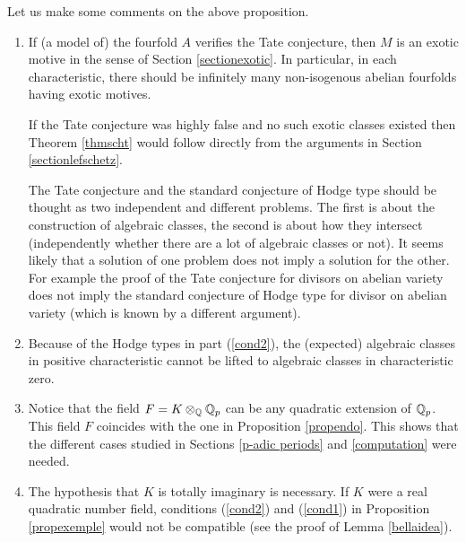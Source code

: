 \begin{remark}
\notready\label{bellaciao} Let us make some comments on the above proposition.
\begin{enumerate}
\item If (a model of) the fourfold $A$ verifies the Tate conjecture, then $M$ is an exotic motive in the sense of Section \ref{sectionexotic}. In particular, in each characteristic, there should be infinitely  many non-isogenous abelian fourfolds having exotic motives.

If the Tate conjecture was highly false and no such exotic classes existed then Theorem \ref{thmscht} would follow directly from the arguments in Section \ref{sectionlefschetz}.

The Tate conjecture and the standard conjecture of Hodge type   should be thought as two independent and different  problems. The first is about the construction of algebraic classes, the second is about how they intersect (independently whether there are a lot of algebraic classes or not). It seems likely that a solution of one problem does not imply a solution for the other. For example the proof of the Tate conjecture for divisors on abelian variety  \cite[Theorem 4]{Tate} does not imply the standard conjecture of Hodge type for divisor on abelian variety (which is known by a different argument).


\item Because of the Hodge types in part (\ref{cond2}), the (expected) algebraic classes in positive characteristic cannot be lifted to algebraic classes in characteristic zero.


\item\label{unamattina} Notice that the field $F=K \otimes_{\mathbb{Q}} \mathbb{Q}_p$ can be any quadratic extension of $\mathbb{Q}_p$. This field $F$ coincides with the one in Proposition \ref{propendo}. This shows that the different cases studied in Sections \ref{p-adic periods} and \ref{computation} were needed.
\item The hypothesis that $K$ is totally imaginary is necessary. If $K$ were a real quadratic  number field,  conditions    (\ref{cond2}) and (\ref{cond1}) in Proposition  \ref{propexemple} would not be compatible (see the proof of  Lemma \ref{bellaidea}).
\end{enumerate}
\end{remark}

